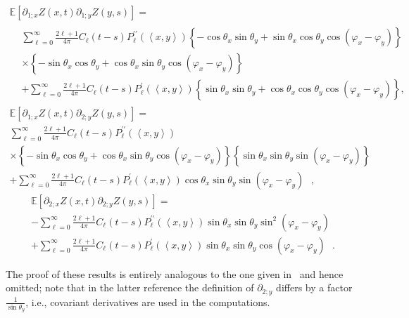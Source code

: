 \documentclass[AHL,Unicode,longabstracts,published]{cedram}
\newcommand{\bbE}{\mathbb{E}}
\begin{document}
\begin{lemm}
\begin{multline*}
\bbE\left[\partial _{1;x}Z(x,t)\partial _{1;y}Z(y,s)\right] =
\\
\begin{aligned}
&\sum_{\ell =0}^{\infty }\frac{2\ell +1}{4\pi }C_{\ell }(t-s)P_{\ell }^{\prime \prime }(\left\langle x,y\right\rangle)\left\{ -\cos \theta _{x}\sin \theta _{y}+\sin \theta _{x}\cos \theta _{y}\cos (\varphi _{x}-\varphi _{y})\right\} \\
&\times \left\{ -\sin \theta _{x}\cos \theta _{y}+\cos \theta _{x}\sin
\theta _{y}\cos (\varphi _{x}-\varphi _{y})\right\} \\
&+\sum_{\ell =0}^{\infty }\frac{2\ell +1}{4\pi }C_{\ell }(t-s)P_{\ell }^{\prime }(\left\langle x,y\right\rangle)\left\{ \sin \theta _{x}\sin
\theta _{y}+\cos \theta _{x}\cos \theta _{y}\cos (\varphi _{x}-\varphi _{y})\right\} \text{,}
\end{aligned}
\end{multline*}
\begin{multline*}
\bbE\left[\partial _{1;x}Z(x,t)\partial _{2;y}Z(y,s)\right] =
\\
\sum_{\ell =0}^{\infty }\frac{2\ell +1}{4\pi }C_{\ell }(t-s)P_{\ell }^{\prime \prime }(\left\langle x,y\right\rangle) \\
\times \left\{ -\sin \theta _{x}\cos \theta _{y}+\cos \theta _{x}\sin
\theta _{y}\cos (\varphi _{x}-\varphi _{y})\right\} \left\{ \sin \theta _{x}\sin \theta _{y}\sin (\varphi _{x}-\varphi _{y})\right\} \\
+\sum_{\ell =0}^{\infty }\frac{2\ell +1}{4\pi }C_{\ell }(t-s)P_{\ell }^{\prime }(\left\langle x,y\right\rangle)\cos \theta _{x}\sin \theta _{y}\sin (\varphi _{x}-\varphi _{y})\text{ },
\end{multline*}
\begin{multline*}
\bbE\left[\partial _{2;x}Z(x,t)\partial _{2;y}Z(y,s)\right] =
\\
-\sum_{\ell =0}^{\infty }\frac{2\ell +1}{4\pi }C_{\ell }(t-s)P_{\ell }^{\prime \prime }(\left\langle x,y\right\rangle)\sin \theta _{x}\sin
\theta _{y}\sin ^{2}(\varphi _{x}-\varphi _{y}) \\
+\sum_{\ell =0}^{\infty }\frac{2\ell +1}{4\pi }C_{\ell }(t-s)P_{\ell }^{\prime }(\left\langle x,y\right\rangle)\sin \theta _{x}\sin \theta _{y}\cos (\varphi _{x}-\varphi _{y})\text{ }.
\end{multline*}
\end{lemm}

The proof of these results is entirely analogous to the one given in~\cite[App\-endix]{CM20} and hence omitted; note that in the latter reference the definition of $\partial _{2;y}$ differs by a factor $\frac{1}{\sin \theta_{y}}$, i.e., covariant derivatives are used in the computations.
\end{document}
